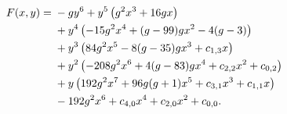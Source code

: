 \begin{align}
    \label{curve:quartic_ggm}
    F(x,y)={} & -gy^{6}{}+y^{5}\left(g^2x^{3} + 16 gx\right)\notag \\
              & {}+y^{4}\left(-15 g^2x^{4} + (g-99) gx^{2} - 4 (g-3)\right)\notag \\
              & {}+y^{3}\left(84 g^2x^{5} - 8 (g-35) gx^{3} + c_{1,3}x\right)\notag \\
              & {}+y^{2}\left(-208 g^2x^{6} + 4 (g-83) gx^{4} + c_{2,2}x^{2} + c_{0,2}\right)\notag \\
              & {}+y\left(192 g^2x^{7} + 96 g (g+1)x^{5} + c_{3,1}x^{3} + c_{1,1}x\right)\notag \\
              & {}-192 g^2x^{6} + c_{4,0}x^{4} + c_{2,0}x^{2} + c_{0,0}.
\end{align}
